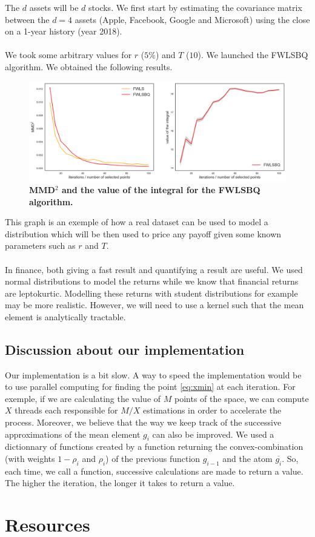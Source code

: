 The $d$ assets will be $d$ stocks. We first start by estimating the covariance matrix between the $d = 4$ assets (Apple, Facebook, Google and Microsoft) using the close on a 1-year history (year 2018). \\
\\
We took some arbitrary values for $r$ ($5\%$) and $T$ ($10$). We launched the FWLSBQ algorithm. We obtained the following results.
\begin{figure}[H]
\begin{center}
	\includegraphics[scale=0.25]{plot-application-mmdsquared-value-FWLSBQ.png}
	\caption{\textbf{MMD$^2$ and the value of the integral for the FWLSBQ algorithm.}}
\end{center}
\end{figure}
This graph is an exemple of how a real dataset can be used to model a distribution which will be then used to price any payoff given some known parameters such as $r$ and $T$.
\\ \\
In finance, both giving a fast result and quantifying a result are useful. We used normal distributions to model the returns while we know that financial returns are leptokurtic. Modelling these returns with student distributions for example may be more realistic. However, we will need to use a kernel such that the mean element is analytically tractable.

\subsection{Discussion about our implementation}
Our implementation is a bit slow. A way to speed the implementation would be to use parallel computing for finding the point \eqref{eq:xmin} at each iteration. For exemple, if we are calculating the value of $M$ points of the space, we can compute $X$ threads each responsible for $M/X$ estimations in order to accelerate the process. Moreover, we believe that the way we keep track of the successive approximations of the mean element $g_{i}$ can also be improved. We used a dictionnary of functions created by a function returning the convex-combination (with weights $1-\rho_{i}$ and $\rho_{i}$) of the previous function $g_{i-1}$ and the atom $\overline{g_i}$. So, each time, we call a function, successive calculations are made to return a value. The higher the iteration, the longer it takes to return a value.


\section*{Resources}
\label{sec:bibli}

\nocite{*}
\printbibliography[heading=none]
